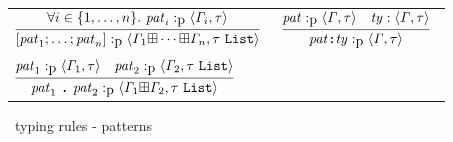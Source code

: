 \documentclass[final]{article}
\begin{document}
\begin{figure}[t]
\begin{small}
\begin{center}
\begin{tabular}{llll}
    \multicolumn{2}{l}{
      $\MEMinferb
      {\MEMtypingpat{\CONSlistn{\METApat_1}{\METApat_n}}{\MEMequnion{\METAityenv_1}{\MEMequnion{\cdots}{\METAityenv_n}}}{\CONSconsty{\METAity}{\CONSlistty}}}
      {\forallexp{i\in\{1,\dots,n\}}{\MEMtypingpat{\METApat_i}{\METAityenv_i}{\METAity}}}$
    }

    &

    \multicolumn{2}{l}{
      $\MEMinferc
      {\MEMtypingpat{\CONStyppat{\METApat}{\METAty}}{\METAityenv}{\METAity}}
      {\MEMtypingpat{\METApat}{\METAityenv}{\METAity}}
      {\MEMtyping{\METAty}{\METAityenv}{\METAity}}$
    }

    \\
    &&&
    \\

    \multicolumn{4}{l}{
      $\MEMinferc
      {\MEMtypingpat{\CONSoplistpat{\METApat_1}{\METApat_2}}{\MEMequnion{\METAityenv_1}{\METAityenv_2}}{\CONSconsty{\METAity}{\CONSlistty}}}
      {\MEMtypingpat{\METApat_1}{\METAityenv_1}{\METAity}}
      {\MEMtypingpat{\METApat_2}{\METAityenv_2}{\CONSconsty{\METAity}{\CONSlistty}}}$
    }
  \end{tabular}
\end{center}
\caption{\eml\ typing rules - patterns}
\label{fig:typing-rules-patterns}
\end{small}
\end{figure}
\end{document}
